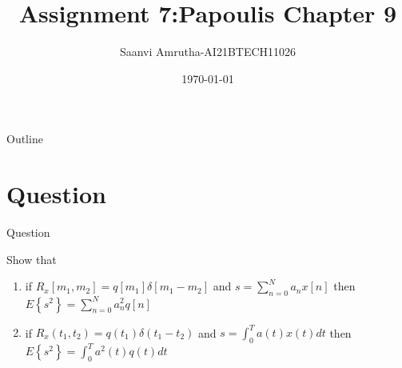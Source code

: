\documentclass{beamer}
\title{Assignment 7:Papoulis Chapter 9}
\author{Saanvi Amrutha-AI21BTECH11026}
\date{\today}
\providecommand{\cbrak}[1]{\ensuremath{\left\{#1\right\}}}
\providecommand{\brak}[1]{\ensuremath{\left(#1\right)}}
\begin{document}
\begin{frame}
    \titlepage 
\end{frame}

\logo{}

\begin{frame}{Outline}
    \tableofcontents
\end{frame}

\section{Question}
\begin{frame}{Question}
    \begin{block}{}
       Show that 
       \begin{enumerate} 
       \item if $R_x[m_1,m_2]= q[m_1]\delta[m_1 - m_2]$ and $s=\sum_{n=0}^N a_n x[n]$ then $E\cbrak{s^2}=\sum_{n=0}^N a_n^2q[n]$\\
       \item if $R_x\brak{t_1,t_2}=q\brak{t_1}\delta\brak{t_1-t_2}$ and $s=\int_{0}^{T}a\brak{t}x\brak{t}dt$ then 
       $E\cbrak{s^2}=\int_{0}^{T}a^2\brak{t}q\brak{t}dt$
       \end{enumerate}
    \end{block}
\end{frame}
\end{document}
